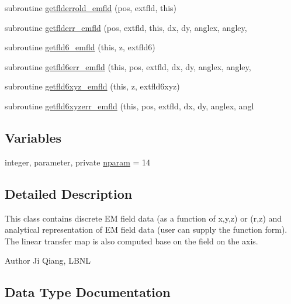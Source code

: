 \begin{DoxyCompactItemize}
\item 
subroutine \mbox{\hyperlink{namespaceemfldclass_a828e010a02ef4b8d9806f8d4c3053126}{getflderrold\+\_\+emfld}} (pos, extfld, this)
\item 
subroutine \mbox{\hyperlink{namespaceemfldclass_ad7628b9fdaf5e839e55f71c3f8678c11}{getflderr\+\_\+emfld}} (pos, extfld, this, dx, dy, anglex, angley,
\item 
subroutine \mbox{\hyperlink{namespaceemfldclass_a7eb67a0a1ce6ea3f37b4c55e40048f4a}{getfld6\+\_\+emfld}} (this, z, extfld6)
\item 
subroutine \mbox{\hyperlink{namespaceemfldclass_ab5c872006557986fafd6080666ca68f1}{getfld6err\+\_\+emfld}} (this, pos, extfld, dx, dy, anglex, angley,
\item 
subroutine \mbox{\hyperlink{namespaceemfldclass_a6a4833c66a8430fe7d7c3e005dd34c6e}{getfld6xyz\+\_\+emfld}} (this, z, extfld6xyz)
\item 
subroutine \mbox{\hyperlink{namespaceemfldclass_a53a2dd6514711afd20442dab5686c5a4}{getfld6xyzerr\+\_\+emfld}} (this, pos, extfld, dx, dy, anglex, angl
\end{DoxyCompactItemize}
\subsection*{Variables}
\begin{DoxyCompactItemize}
\item 
integer, parameter, private \mbox{\hyperlink{namespaceemfldclass_ad6fed90f4153b92a9a9ff35a6ef146c3}{nparam}} = 14
\end{DoxyCompactItemize}


\subsection{Detailed Description}
This class contains discrete EM field data (as a function of x,y,z) or (r,z) and analytical representation of EM field data (user can supply the function form). The linear transfer map is also computed base on the field on the axis. 

\begin{DoxyAuthor}{Author}
Ji Qiang, L\+B\+NL 
\end{DoxyAuthor}


\subsection{Data Type Documentation}
\label{structemfldclass_1_1emfld}
